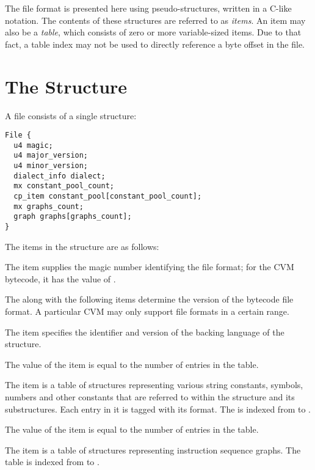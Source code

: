 The  file format is presented here using pseudo-structures, written in a C-like notation. The contents of these structures are referred to as {\em items}. An item may also be a {\em table}, which consists of zero or more variable-sized items. Due to that fact, a table index may not be used to directly reference a byte offset in the file. 






\section{The  Structure}

A  file consists of a single  structure: 

\begin{lstlisting}
File {
  u4 magic;
  u4 major_version;
  u4 minor_version;
  dialect_info dialect;
  mx constant_pool_count;
  cp_item constant_pool[constant_pool_count];
  mx graphs_count;
  graph graphs[graphs_count];
}
\end{lstlisting}

The items in the  structure are as follows: 

\begin{description}[font=\ttfamily\mdseries,style=nextline]
  \item[magic]
  The  item supplies the magic number identifying the  file format; for the CVM bytecode, it has the value of . 
  \item[major\_version, minor\_version]
  The  along with the following  items determine the version of the bytecode file format. A particular CVM may only support file formats in a certain range. 
  \item[dialect]
  The  item specifies the identifier and version of the backing language of the  structure. 
  \item[constant\_pool\_count]
  The value of the  item is equal to the number of entries in the  table. 
  \item[constant\_pool]
  The  item is a table of structures representing various string constants, symbols, numbers and other constants that are referred to within the  structure and its substructures. Each entry in it is tagged with its format. The  is indexed from  to . 
  \item[graphs\_count]
  The value of the  item is equal to the number of entries in the  table. 
  \item[graphs]
  The  item is a table of structures representing instruction sequence graphs. The  table is indexed from  to . 
\end{description}





